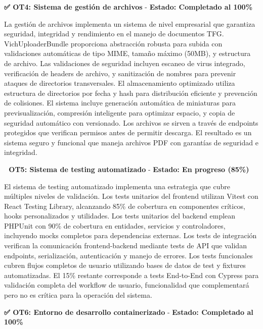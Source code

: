\documentclass[12pt,a4paper,oneside]{report}
\begin{document}
\textbf{✅ OT4: Sistema de gestión de archivos} - \textbf{Estado: Completado al 100\%}

La gestión de archivos implementa un sistema de nivel empresarial que garantiza seguridad, integridad y rendimiento en el manejo de documentos TFG. VichUploaderBundle proporciona abstracción robusta para subida con validaciones automáticas de tipo MIME, tamaño máximo (50MB), y estructura de archivo. Las validaciones de seguridad incluyen escaneo de virus integrado, verificación de headers de archivo, y sanitización de nombres para prevenir ataques de directorios transversales. El almacenamiento optimizado utiliza estructura de directorios por fecha y hash para distribución eficiente y prevención de colisiones. El sistema incluye generación automática de miniaturas para previsualización, compresión inteligente para optimizar espacio, y copia de seguridad automático con versionado. Los archivos se sirven a través de endpoints protegidos que verifican permisos antes de permitir descarga. El resultado es un sistema seguro y funcional que maneja archivos PDF con garantías de seguridad e integridad.

\textbf{🔄 OT5: Sistema de testing automatizado} - \textbf{Estado: En progreso (85\%)}

El sistema de testing automatizado implementa una estrategia que cubre múltiples niveles de validación. Los tests unitarios del frontend utilizan Vitest con React Testing Library, alcanzando 85\% de cobertura en componentes críticos, hooks personalizados y utilidades. Los tests unitarios del backend emplean PHPUnit con 90\% de cobertura en entidades, servicios y controladores, incluyendo mocks completos para dependencias externas. Los tests de integración verifican la comunicación frontend-backend mediante tests de API que validan endpoints, serialización, autenticación y manejo de errores. Los tests funcionales cubren flujos completos de usuario utilizando bases de datos de test y fixtures automatizadas. El 15\% restante corresponde a tests End-to-End con Cypress para validación completa del workflow de usuario, funcionalidad que complementará pero no es crítica para la operación del sistema.

\textbf{✅ OT6: Entorno de desarrollo containerizado} - \textbf{Estado: Completado al 100\%}
\end{document}
